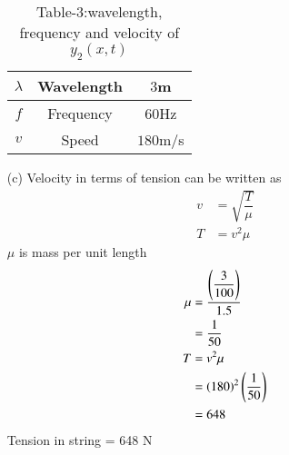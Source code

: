 \documentclass[journal,12pt,twocolumn]{IEEEtran}
\theoremstyle{remark}
\begin{document}
\begin{enumerate}
\begin{table}[h]
\begin{tabular}{|c|c|c|}
    \hline
    $\lambda$ & Wavelength & $3$m\\
    \hline
    $f$ & Frequency & $60$Hz \\
    \hline
    $v$ & Speed & $180$m/s\\
    \hline
  \end{tabular}
  \caption{Table-3:wavelength, frequency and velocity of $y_2(x,t)$}
  \label{tab:mytable2}
\end{table}
\item[(c)] Velocity in terms of tension can be written as
\begin{align}
v&=\sqrt{\dfrac{T}{\mu}}\\
T&=v^2\mu
\end{align}
$\mu$ is mass per unit length
\begin{align}
\mu&=\dfrac{\left(\dfrac{3}{100}\right)}{1.5}\\
&=\dfrac{1}{50}\\
T&=v^2\mu\\
&=\left(180\right)^2\left(\dfrac{1}{50}\right)\\
&=648
\end{align}
Tension in string = 648 N
\end{enumerate}
\end{document}
